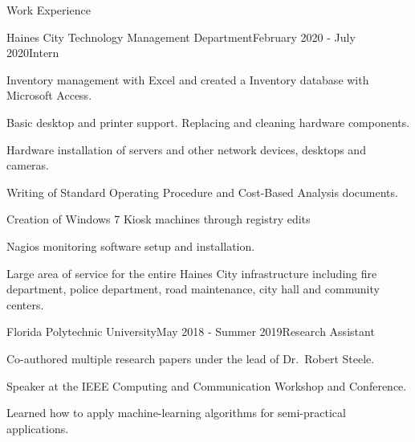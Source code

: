 \documentclass{resume} %
\begin{document}
\begin{rSection}{Work Experience}

\begin{rSubsection}{Haines City Technology Management Department}{February 2020 - July 2020}{Intern}{}
	\item
	Inventory management with Excel and created a Inventory database with Microsoft Access.
	\item
	Basic desktop and printer support. Replacing and cleaning hardware components.
	\item
	Hardware installation of servers and other network devices, desktops and cameras.
	\item
	Writing of Standard Operating Procedure and Cost-Based Analysis documents.
	\item
	Creation of Windows 7 Kiosk machines through registry edits
	\item
	Nagios monitoring software setup and installation.
	\item
	Large area of service for the entire Haines City infrastructure including fire department,
	police department, road maintenance, city hall and community centers.
\end{rSubsection}
\newpage
\begin{rSubsection}{Florida Polytechnic University}{May 2018 - Summer 2019}{Research Assistant}{}
	\item
	Co-authored multiple research papers under the lead of Dr.\ Robert Steele.
	\item
	Speaker at the IEEE Computing and Communication Workshop and Conference.
	\item
	Learned how to apply machine-learning algorithms for semi-practical applications.
\end{rSubsection}

\end{rSection}



\end{document}
